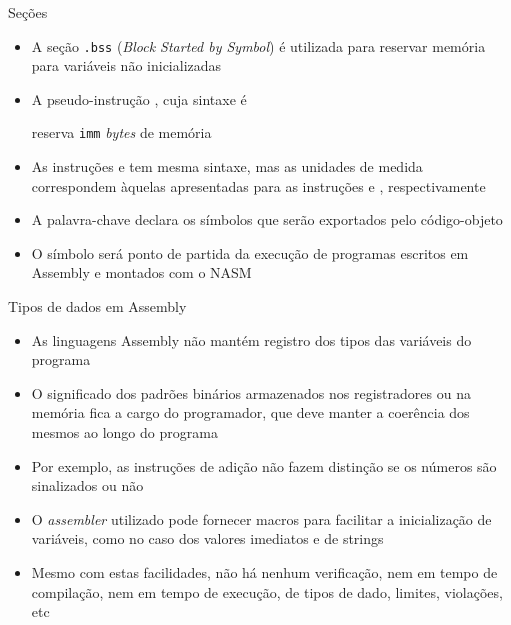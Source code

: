 \begin{frame}[fragile]{Seções}

    \begin{itemize}
        \item A seção \texttt{.bss} (\textit{Block Started by Symbol}) é utilizada para reservar
            memória para variáveis não inicializadas

        \item A pseudo-instrução , cuja sintaxe é


        reserva \texttt{imm} \textit{bytes} de memória

        \item As instruções  e  tem mesma sintaxe, mas
            as unidades de medida correspondem àquelas apresentadas para as instruções
             e , respectivamente

        \item A palavra-chave  declara os símbolos que serão exportados pelo
            código-objeto

        \item O símbolo  será ponto de partida da execução de programas
            escritos em Assembly e montados com o NASM
    \end{itemize}

\end{frame}

\begin{frame}[fragile]{Tipos de dados em Assembly}

    \begin{itemize}
        \item As linguagens Assembly não mantém registro dos tipos das variáveis do programa

        \item O significado dos padrões binários armazenados nos registradores ou na memória
            fica a cargo do programador, que deve manter a coerência dos mesmos ao longo do
            programa

        \item Por exemplo, as instruções de adição não fazem distinção se os números são
            sinalizados ou não

        \item O \textit{assembler} utilizado pode fornecer macros para facilitar a inicialização
            de variáveis, como no caso dos valores imediatos e de strings

        \item Mesmo com estas facilidades, não há nenhum verificação, nem em tempo de compilação,
            nem em tempo de execução, de tipos de dado, limites, violações, etc
    \end{itemize}

\end{frame}

